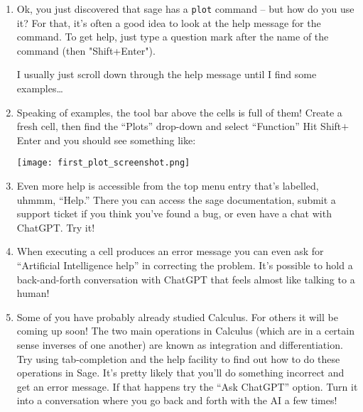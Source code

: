 \begin{enumerate}
\item Ok, you just discovered that sage has a \verb+plot+ command -- but how do you use it? For that, it's often a good idea to look at the help message for the command. To get help, just type a question mark after the name of the command (then "Shift+Enter").

\noindent I usually just scroll down through the help message until I find some examples\dots

\item Speaking of examples, the tool bar above the cells is full of them!  Create a fresh cell, then find the ``Plots'' drop-down and select ``Function''  Hit Shift$+$Enter and you should see something like:

\texttt{[image: first\_plot\_screenshot.png]}

\item Even more help is accessible from the top menu entry that's labelled, uhmmm, ``Help.''  There you can access the sage documentation, submit a support ticket if you think you've found a bug, or even have a chat with ChatGPT.  Try it!

\item When executing a cell produces an error message you can even ask for ``Artificial Intelligence help'' in correcting the problem.  It's possible to hold a back-and-forth conversation with ChatGPT that feels almost like talking to a human!

\item Some of you have probably already studied Calculus.  For others it will be coming up soon! The two main operations in Calculus (which are in a certain sense inverses of one another) are known as integration and differentiation.  Try using tab-completion and the help facility to find out how to do these operations in Sage.  It's pretty likely that you'll do something incorrect and get an error message.  If that happens try the ``Ask ChatGPT'' option.  Turn it into a conversation where you go back and forth with the AI a few times!

\end{enumerate}
